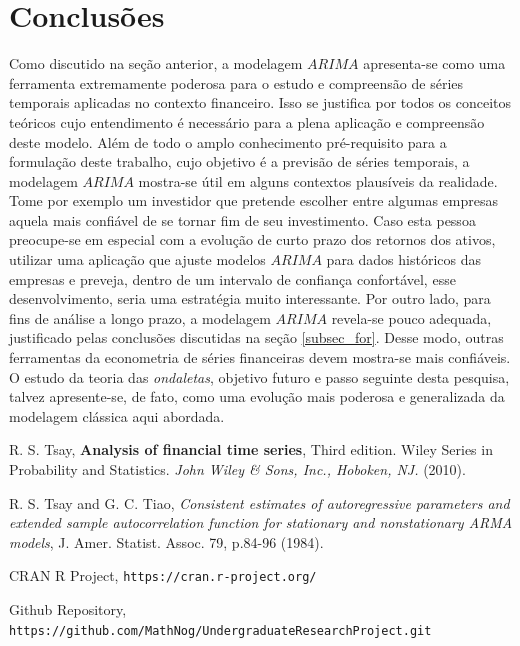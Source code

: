 \documentclass[12pt]{article}
\begin{document}
\section{Conclusões}
Como discutido na seção anterior, a modelagem $ARIMA$ apresenta-se como uma ferramenta extremamente poderosa para o estudo e compreensão de séries temporais aplicadas no contexto financeiro. Isso se justifica por todos os conceitos teóricos cujo entendimento é necessário para a plena aplicação e compreensão deste modelo. Além de todo o amplo conhecimento pré-requisito para a formulação deste trabalho, cujo objetivo é a previsão de séries temporais, a modelagem $ARIMA$ mostra-se útil em alguns contextos plausíveis da realidade. Tome por exemplo um investidor que pretende escolher entre algumas empresas aquela mais confiável de se tornar fim de seu investimento. Caso esta pessoa preocupe-se em especial com a evolução de curto prazo dos retornos dos ativos, utilizar uma aplicação que ajuste modelos $ARIMA$ para dados históricos das empresas e preveja, dentro de um intervalo de confiança confortável, esse desenvolvimento, seria uma estratégia muito interessante. Por outro lado, para fins de análise a longo prazo, a modelagem $ARIMA$ revela-se pouco adequada, justificado pelas conclusões discutidas na seção \ref{subsec_for}. Desse modo, outras ferramentas da econometria de séries financeiras devem mostra-se mais confiáveis. O estudo da teoria das \emph{ondaletas}, objetivo futuro e passo seguinte desta pesquisa, talvez apresente-se, de fato, como uma evolução mais poderosa e generalizada da modelagem clássica aqui abordada.


\begin{thebibliography}{99} 
	
	 R. S. Tsay,
	{\bf Analysis of financial time series},
	Third edition. Wiley Series in Probability and Statistics. {\it John Wiley \& Sons, Inc., Hoboken, NJ.}  (2010).
	
	 R. S. Tsay and G. C. Tiao,
	{\it Consistent estimates of autoregressive parameters and extended sample autocorrelation function for stationary and nonstationary ARMA models},
	J. Amer. Statist. Assoc. 79, p.84-96 (1984).
	
	CRAN R Project, \texttt{https://cran.r-project.org/}
	
	Github Repository, \texttt{https://github.com/MathNog/UndergraduateResearchProject.git}
	
\end{thebibliography}
\end{document}
